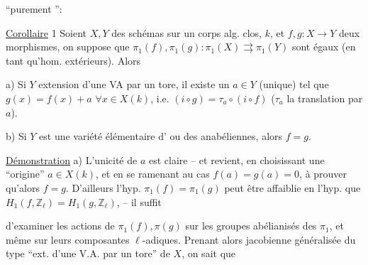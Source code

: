 \uline{} ``purement '':

\uline{Corollaire} 1 Soient $X,Y$ des schémas  sur un corps alg. clos, $k$, et $f,g:X\longrightarrow Y$ deux morphismes, on suppose que $\pi_1(f),\pi_1(g):\pi_1(X)\rightrightarrows\pi_1(Y)$ sont égaux (en tant qu'hom. extérieurs). Alors

a) Si $Y$   extension d'une VA par un tore, il existe un $a\in Y$ (unique) tel que $g(x)=f(x)+a$ $\forall x\in X(k)$, i.e. $(i\circ g)=\tau_a\circ(i\circ f)$ ($\tau_a$ la translation par $a$).

b) Si $Y$ est une variété élémentaire d' ou    des  anabéliennes,  alors $f=g$.


\uline{Démonstration} a) L'unicité de $a$ est claire -- et   revient,  en choisissant une ``origine'' $a\in X(k)$, et en se ramenant au cas $f(a)=g(a)=0$, à prouver qu'alors $f=g$. D'ailleurs l'hyp. $\pi_1(f)=\pi_1(g)$ peut être affaiblie en l'hyp. que  $H_1(f,\mathbb Z_\ell)=H_1(g,\mathbb Z_\ell)$,  --  il suffit

d'examiner les actions de $\pi_1(f),\pi(g)$ sur les groupes abélianisés des $\pi_1$, et même sur leurs composantes $\ell$-adiques. Prenant alors jacobienne généralisée du type ``ext. d'une V.A. par un tore'' de $X$, on sait que

